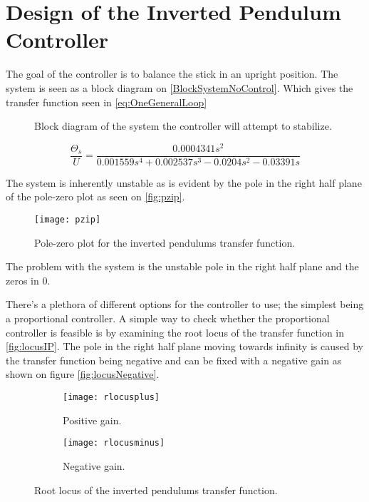 \graphicspath{{figures/Design/IPController/}}
\chapter{Design of the Inverted Pendulum Controller}\label{sec:IPController}

The goal of the controller is to balance the stick in an upright position. The system is seen as a block diagram on \autoref{BlockSystemNoControl}. Which gives the transfer function seen in \autoref{eq:OneGeneralLoop}
\begin{figure}[htbp]
\centering
\missingfigure{}
\caption{Block diagram of the system the controller will attempt to stabilize.}
\label{fig:BlockSystemNoControl}
\end{figure}

\begin{equation}\label{eq:OneGeneralLoop}
	\frac{\Theta_s}{U}=\frac{0.0004341 s^2}{0.001559 s^4 + 0.002537 s^3 - 0.0204 s^2 - 0.03391 s}
\end{equation}

The system is inherently unstable as is evident by the pole in the right half plane of the pole-zero plot as seen on \autoref{fig:pzip}.

\begin{figure}[htbp]
\centering
\texttt{[image: pzip]}
\caption{Pole-zero plot for the inverted pendulums transfer function.}
\label{fig:pzip}
\end{figure}

The problem with the system is the unstable pole in the right half plane and the zeros in 0.

There's a plethora of different options for the controller to use; the simplest being a proportional controller. A simple way to check whether the proportional controller is feasible is by examining the root locus of the transfer function in \autoref{fig:locusIP}. The pole in the right half plane moving towards infinity is caused by the transfer function being negative and can be fixed with a negative gain as shown on figure \autoref{fig:locusNegative}.

\begin{figure}[htbp]
\centering
	\begin{subfigure}{0.45\textwidth}
	\texttt{[image: rlocusplus]}
	\caption{Positive gain.}
	\label{fig:locusIP}
	\end{subfigure}
	\begin{subfigure}{0.45\textwidth}
	\centering
	\texttt{[image: rlocusminus]}
	\caption{Negative gain.}
	\label{fig:locusNegative}
	\end{subfigure}
\caption{Root locus of the inverted pendulums transfer function.}
\end{figure}

